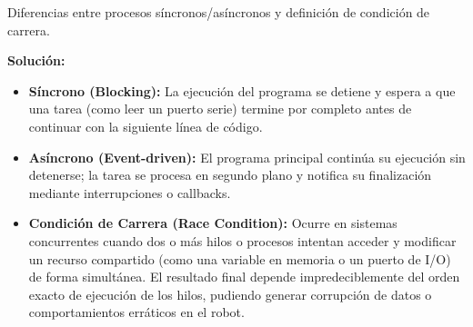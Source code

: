 \documentclass[11pt, a4paper]{article}
\begin{document}
\begin{enunciado}
Diferencias entre procesos síncronos/asíncronos y definición de condición de carrera.
\end{enunciado}

\textbf{Solución:}
\begin{itemize}
    \item \textbf{Síncrono (Blocking):} La ejecución del programa se detiene y espera a que una tarea (como leer un puerto serie) termine por completo antes de continuar con la siguiente línea de código.
    \item \textbf{Asíncrono (Event-driven):} El programa principal continúa su ejecución sin detenerse; la tarea se procesa en segundo plano y notifica su finalización mediante interrupciones o callbacks.
    \item \textbf{Condición de Carrera (Race Condition):} Ocurre en sistemas concurrentes cuando dos o más hilos o procesos intentan acceder y modificar un recurso compartido (como una variable en memoria o un puerto de I/O) de forma simultánea. El resultado final depende impredeciblemente del orden exacto de ejecución de los hilos, pudiendo generar corrupción de datos o comportamientos erráticos en el robot.
\end{itemize}
\end{document}
